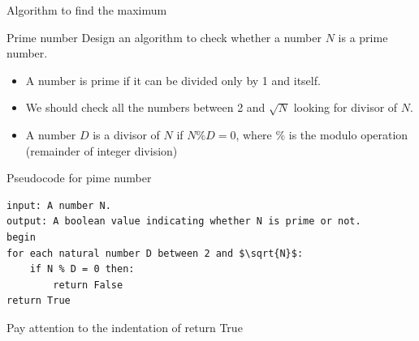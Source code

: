 \documentclass[aspectratio=169,]{beamer}
\begin{document}
\begin{frame}[fragile]{Algorithm to find the maximum}
\begin{minipage}{0.49\textwidth}
{
    }
    \end{minipage}
\end{frame}

\begin{frame}{Prime number}
    Design an algorithm to check whether a number $N$ is a prime number.
    \pause
    \begin{itemize}[<+->]
        \item A number is prime if it can be divided only by 1 and itself.
        \item We should check all the numbers between 2 and $\sqrt{N}$ looking for divisor of $N$.
        \item A number $D$ is a divisor of $N$ if $N \% D = 0$, where \% is the modulo operation (remainder of integer
            division)
    \end{itemize}
\end{frame}

\begin{frame}[fragile]{Pseudocode for pime number}
    \begin{lstlisting}[style=pseudo, linewidth=7cm]
input: A number N.
output: A boolean value indicating whether N is prime or not.
begin
for each natural number D between 2 and $\sqrt{N}$:
    if N % D = 0 then:
        return False
return True
    \end{lstlisting}
    Pay attention to the indentation of return True
\end{frame}
\end{document}
